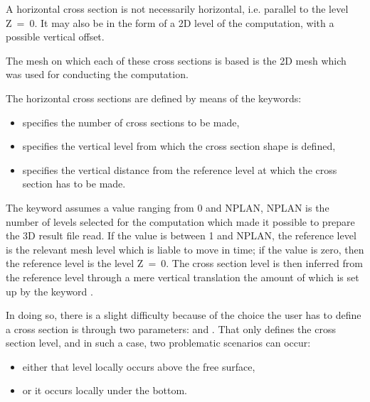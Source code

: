 A horizontal cross section is not necessarily horizontal, i.e. parallel to the
level Z~=~0. It may also be in the form of a 2D level of the 
computation, with a possible vertical offset.

The mesh on which each of these cross sections is based is the 2D mesh which
was used for conducting the  computation.

The horizontal cross sections are defined by means of the keywords:

\begin{itemize}
\item {} specifies the number of
cross sections to be made,

\item {} specifies the
 vertical level from which the cross section shape is defined,

\item {} specifies the vertical distance
from the reference level at which the cross section has to be made.
\end{itemize}

The keyword  assumes a value ranging from 0 and NPLAN,
NPLAN is the number of levels selected for the  computation which
made it possible to prepare the 3D result file read. If the value is between 1
and NPLAN, the reference level is the relevant mesh level which is liable to
move in time; if the value is zero, then the reference level is the level
Z~=~0. The cross section level is then inferred from the reference level
through a mere vertical translation the amount of which is set up by the
keyword .

In doing so, there is a slight difficulty because of the choice the user has to
define a cross section is through two parameters:  and .
That only defines the cross section level, and in such a case, two problematic
scenarios can occur:

\begin{itemize}
\item either that level locally occurs above the free surface,
\item or it occurs locally under the bottom.
\end{itemize}

